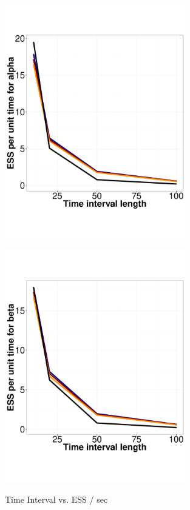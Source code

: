   \begin{figure}%
  \centering
  \begin{minipage}[hp]{0.45\linewidth}
  \centering
    \includegraphics [width=0.70\textwidth, angle=0]{figs/ESS_vs_t_alpha.pdf}
      \end{minipage}
  \begin{minipage}[hp]{0.45\linewidth}
  \centering
    \includegraphics [width=0.70\textwidth, angle=0]{figs/ESS_vs_t_beta.pdf}
    \vspace{-0 in}
     \label{fig:TSS}
  \end{minipage}
    \caption{Time Interval vs. ESS / sec}
  \end{figure}


